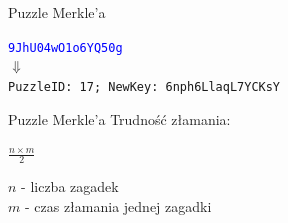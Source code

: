 \begin{frame}{Puzzle Merkle'a}
    \begin{center}
    \texttt{\textcolor{blue}{9JhU04wO1o6YQ50g}} \\
    \pause
    $\Downarrow$ \\
    \texttt{PuzzleID: 17; NewKey: 6nph6LlaqL7YCKsY}
    \end{center}
\end{frame}

\begin{frame}{Puzzle Merkle'a}
    Trudność złamania:
    \begin{center}
        {\Large \( \frac{n \times m}{2} \)} \\[10pt]
    \end{center}
    \( n \) - liczba zagadek \\
    \( m \) - czas złamania jednej zagadki
\end{frame}